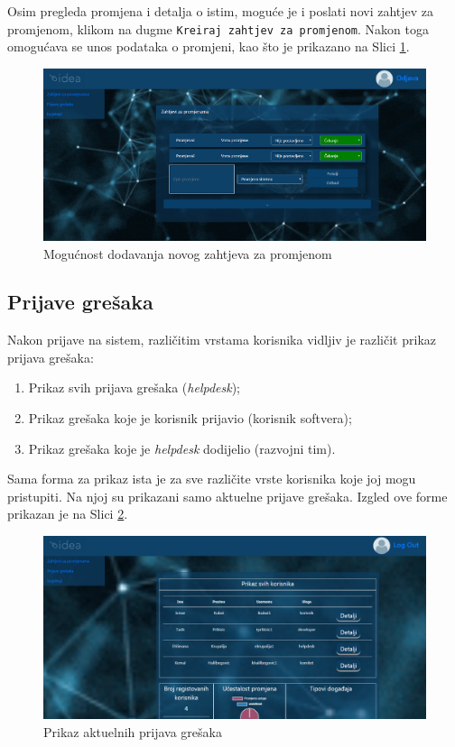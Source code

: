 \documentclass[12pt,a4paper]{article}
\begin{document}
Osim pregleda promjena i detalja o istim, moguće je i poslati novi zahtjev za promjenom, klikom na dugme \texttt{Kreiraj zahtjev za promjenom}. Nakon toga omogućava se unos podataka o promjeni, kao što je prikazano na Slici \ref{s10}.

\begin{figure}[H]
\center
\includegraphics[scale=0.35]{../res/UI/changeAdd.PNG}
\caption{Mogućnost dodavanja novog zahtjeva za promjenom}
\label{s10}
\end{figure}

\newpage

\subsection{Prijave grešaka}

Nakon prijave na sistem, različitim vrstama korisnika vidljiv je različit prikaz prijava grešaka:

\begin{enumerate}
\item Prikaz svih prijava grešaka (\textit{helpdesk});
\item Prikaz grešaka koje je korisnik prijavio (korisnik softvera);
\item Prikaz grešaka koje je \textit{helpdesk} dodijelio (razvojni tim).
\end{enumerate}

Sama forma za prikaz ista je za sve različite vrste korisnika koje joj mogu pristupiti. Na njoj su prikazani samo aktuelne prijave grešaka. Izgled ove forme prikazan je na Slici \ref{s11}.

\begin{figure}[H]
\center
\includegraphics[scale=0.35]{../res/UI/report1.PNG}
\caption{Prikaz aktuelnih prijava grešaka}
\label{s11}
\end{figure}
\end{document}
